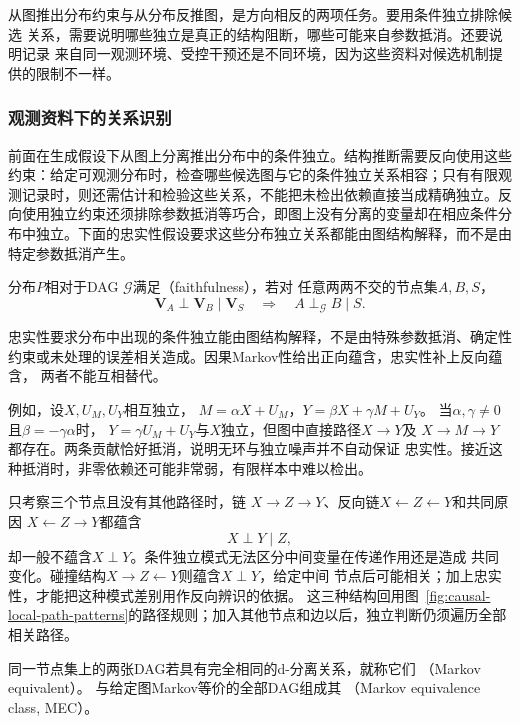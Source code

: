 从图推出分布约束与从分布反推图，是方向相反的两项任务。要用条件独立排除候选
关系，需要说明哪些独立是真正的结构阻断，哪些可能来自参数抵消。还要说明记录
来自同一观测环境、受控干预还是不同环境，因为这些资料对候选机制提供的限制不一样。

\subsubsection{观测资料下的关系识别}
\label{sec:causal-observational-structure}

前面在生成假设下从图上分离推出分布中的条件独立。结构推断需要反向使用这些约束：给定可观测分布时，检查哪些候选图与它的条件独立关系相容；只有有限观测记录时，则还需估计和检验这些关系，不能把未检出依赖直接当成精确独立。反向使用独立约束还须排除参数抵消等巧合，即图上没有分离的变量却在相应条件分布中独立。下面的忠实性假设要求这些分布独立关系都能由图结构解释，而不是由特定参数抵消产生。
\begin{definition}[相对于DAG的忠实性]
  \label{def:causal-faithfulness}
  分布\(P\)相对于DAG \(\mathcal G\)满足（faithfulness），若对
  任意两两不交的节点集\(A,B,S\)，
  \[
    \bm V_A\perp\bm V_B\mid\bm V_S
    \quad\Longrightarrow\quad
    A\perp_{\mathcal G}B\mid S.
  \]
\end{definition}
忠实性要求分布中出现的条件独立能由图结构解释，不是由特殊参数抵消、确定性
约束或未处理的误差相关造成。因果Markov性给出正向蕴含，忠实性补上反向蕴含，
两者不能互相替代。

例如，设\(X,U_M,U_Y\)相互独立，
\(M=\alpha X+U_M\)，\(Y=\beta X+\gamma M+U_Y\)。
当\(\alpha,\gamma\ne0\)且\(\beta=-\gamma\alpha\)时，
\(Y=\gamma U_M+U_Y\)与\(X\)独立，但图中直接路径\(X\to Y\)及
\(X\to M\to Y\)都存在。两条贡献恰好抵消，说明无环与独立噪声并不自动保证
忠实性。接近这种抵消时，非零依赖还可能非常弱，有限样本中难以检出。

只考察三个节点且没有其他路径时，链
\(X\to Z\to Y\)、反向链\(X\leftarrow Z\leftarrow Y\)和共同原因
\(X\leftarrow Z\to Y\)都蕴含
\[
  X\perp Y\mid Z,
\]
却一般不蕴含\(X\perp Y\)。条件独立模式无法区分中间变量在传递作用还是造成
共同变化。碰撞结构\(X\to Z\leftarrow Y\)则蕴含\(X\perp Y\)，给定中间
节点后可能相关；加上忠实性，才能把这种模式差别用作反向辨识的依据。
这三种结构回用图~\ref{fig:causal-local-path-patterns}的路径规则；加入其他节点和边以后，独立判断仍须遍历全部相关路径。

\begin{definition}[Markov等价与等价类]
  \label{def:causal-markov-equivalence}
  同一节点集上的两张DAG若具有完全相同的d-分离关系，就称它们
  （Markov equivalent）。
  与给定图Markov等价的全部DAG组成其
  （Markov equivalence class, MEC）。
\end{definition}

